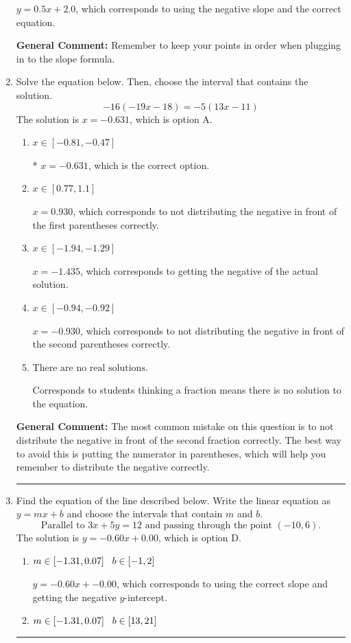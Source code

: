 \documentclass{extbook}[14pt]
\newcommand{\litem}[1]{\item #1

\rule{\textwidth}{0.4pt}}
\begin{document}
\begin{enumerate}
{\begin{enumerate}[label=\Alph*.]
 $y = 0.5x + 2.0$, which corresponds to using the negative slope and the correct equation.
\end{enumerate}

\textbf{General Comment:} Remember to keep your points in order when plugging in to the slope formula.
}
\litem{
Solve the equation below. Then, choose the interval that contains the solution.
\[ -16(-19x -18) = -5(13x -11) \]
The solution is \( x = -0.631 \), which is option A.\begin{enumerate}[label=\Alph*.]
\item \( x \in [-0.81, -0.47] \)

* $x = -0.631$, which is the correct option.
\item \( x \in [0.77, 1.1] \)

$x = 0.930$, which corresponds to not distributing the negative in front of the first parentheses correctly.
\item \( x \in [-1.94, -1.29] \)

$x = -1.435$, which corresponds to getting the negative of the actual solution.
\item \( x \in [-0.94, -0.92] \)

$x = -0.930$, which corresponds to not distributing the negative in front of the second parentheses correctly.
\item \( \text{There are no real solutions.} \)

Corresponds to students thinking a fraction means there is no solution to the equation.
\end{enumerate}

\textbf{General Comment:} The most common mistake on this question is to not distribute the negative in front of the second fraction correctly. The best way to avoid this is putting the numerator in parentheses, which will help you remember to distribute the negative correctly.
}
\litem{
Find the equation of the line described below. Write the linear equation as $ y=mx+b $ and choose the intervals that contain $m$ and $b$.
\[ \text{Parallel to } 3 x + 5 y = 12 \text{ and passing through the point } (-10, 6). \]
The solution is \( y = -0.60x + 0.00 \), which is option D.\begin{enumerate}[label=\Alph*.]
\item \( m \in [-1.31, 0.07] \hspace*{3mm} b \in [-1, 2] \)

 $y = -0.60x + -0.00$, which corresponds to using the correct slope and getting the negative $y$-intercept.
\item \( m \in [-1.31, 0.07] \hspace*{3mm} b \in [13, 21] \)


\end{enumerate}}
\end{enumerate}
\end{document}
